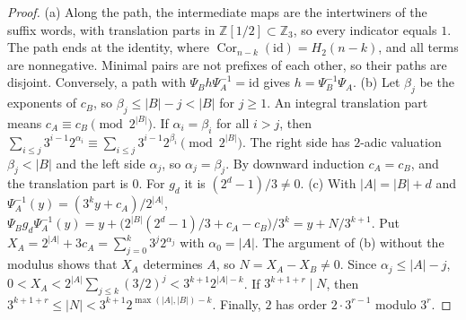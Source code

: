\documentclass[12pt]{amsart}
\theoremstyle{definition}
\theoremstyle{remark}
\newcommand{\Z}{\mathbb{Z}}
\begin{document}
\begin{proof}
(a) Along the path, the intermediate maps are the intertwiners of the suffix words, with translation parts in $\Z[1/2]\subset\Z_3$, so every indicator equals $1$. The path ends at the identity, where $\operatorname{Cor}_{n-k}(\mathrm{id})=H_2(n-k)$, and all terms are nonnegative. Minimal pairs are not prefixes of each other, so their paths are disjoint. Conversely, a path with $\Psi_Bh\Psi_A^{-1}=\mathrm{id}$ gives $h=\Psi_B^{-1}\Psi_A$.
(b) Let $\beta_j$ be the exponents of $c_B$, so $\beta_j\le|B|-j<|B|$ for $j\ge1$. An integral translation part means $c_A\equiv c_B\pmod{2^{|B|}}$. If $\alpha_i=\beta_i$ for all $i>j$, then $\sum_{i\le j}3^{i-1}2^{\alpha_i}\equiv\sum_{i\le j}3^{i-1}2^{\beta_i}\pmod{2^{|B|}}$. The right side has $2$-adic valuation $\beta_j<|B|$ and the left side $\alpha_j$, so $\alpha_j=\beta_j$. By downward induction $c_A=c_B$, and the translation part is $0$. For $g_d$ it is $(2^d-1)/3\ne0$.
(c) With $|A|=|B|+d$ and $\Psi_A^{-1}(y)=(3^ky+c_A)/2^{|A|}$, $\Psi_Bg_d\Psi_A^{-1}(y)=y+\bigl(2^{|B|}(2^d-1)/3+c_A-c_B\bigr)/3^k=y+N/3^{k+1}$. Put $X_A=2^{|A|}+3c_A=\sum_{j=0}^k3^j2^{\alpha_j}$ with $\alpha_0=|A|$. The argument of (b) without the modulus shows that $X_A$ determines $A$, so $N=X_A-X_B\ne0$. Since $\alpha_j\le|A|-j$, $0<X_A<2^{|A|}\sum_{j\le k}(3/2)^j<3^{k+1}2^{|A|-k}$. If $3^{k+1+r}\mid N$, then $3^{k+1+r}\le|N|<3^{k+1}2^{\max(|A|,|B|)-k}$. Finally, $2$ has order $2\cdot3^{r-1}$ modulo $3^r$.
\end{proof}
\end{document}

